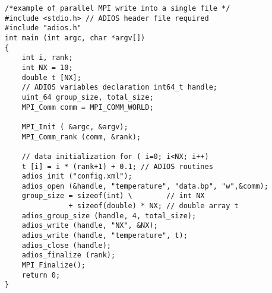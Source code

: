 \begin{lstlisting}[alsolanguage=C,caption={ADIOS programming example.},label={list-adios-prog-example}]
/*example of parallel MPI write into a single file */ 
#include <stdio.h> // ADIOS header file required 
#include "adios.h"
int main (int argc, char *argv[])
{    
    int i, rank; 
    int NX = 10;
    double t [NX];
    // ADIOS variables declaration int64_t handle;
    uint_64 group_size, total_size;
    MPI_Comm comm = MPI_COMM_WORLD; 
    
    MPI_Init ( &argc, &argv);
    MPI_Comm_rank (comm, &rank);

    // data initialization for ( i=0; i<NX; i++)
    t [i] = i * (rank+1) + 0.1; // ADIOS routines 
    adios_init ("config.xml");
    adios_open (&handle, "temperature", "data.bp", "w",&comm); 
    group_size = sizeof(int) \        // int NX
               + sizeof(double) * NX; // double array t
    adios_group_size (handle, 4, total_size);
    adios_write (handle, "NX", &NX);
    adios_write (handle, "temperature", t); 
    adios_close (handle);
    adios_finalize (rank);
    MPI_Finalize(); 
    return 0;
}
\end{lstlisting}
